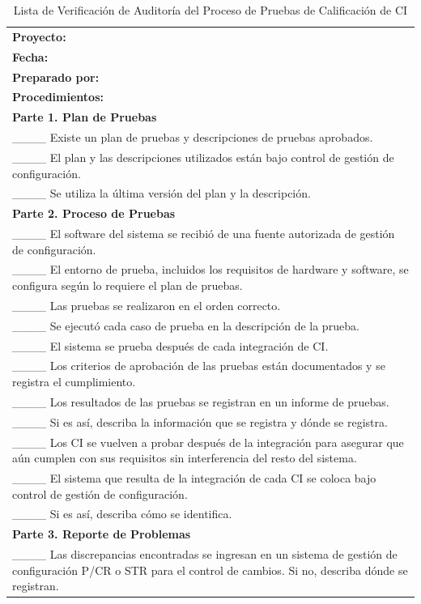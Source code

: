 \begin{table}[H]
\centering
\caption{Lista de Verificación de Auditoría del Proceso de Pruebas de Calificación de CI}
\label{fig:b9}
\begin{tabular}{|p{14cm}|}
\hline
\textbf{Proyecto:} \\
\textbf{Fecha:} \\
\textbf{Preparado por:} \\
\hline
\textbf{Procedimientos:} \\
\textbf{Parte 1. Plan de Pruebas} \\
\_\_\_\_ Existe un plan de pruebas y descripciones de pruebas aprobados. \\
\_\_\_\_ El plan y las descripciones utilizados están bajo control de gestión de configuración. \\
\_\_\_\_ Se utiliza la última versión del plan y la descripción. \\
\textbf{Parte 2. Proceso de Pruebas} \\
\_\_\_\_ El software del sistema se recibió de una fuente autorizada de gestión de configuración. \\
\_\_\_\_ El entorno de prueba, incluidos los requisitos de hardware y software, se configura según lo requiere el plan de pruebas. \\
\_\_\_\_ Las pruebas se realizaron en el orden correcto. \\
\_\_\_\_ Se ejecutó cada caso de prueba en la descripción de la prueba. \\
\_\_\_\_ El sistema se prueba después de cada integración de CI. \\
\_\_\_\_ Los criterios de aprobación de las pruebas están documentados y se registra el cumplimiento. \\
\_\_\_\_ Los resultados de las pruebas se registran en un informe de pruebas. \\
\_\_\_\_ Si es así, describa la información que se registra y dónde se registra. \\
\_\_\_\_ Los CI se vuelven a probar después de la integración para asegurar que aún cumplen con sus requisitos sin interferencia del resto del sistema. \\
\_\_\_\_ El sistema que resulta de la integración de cada CI se coloca bajo control de gestión de configuración. \\
\_\_\_\_ Si es así, describa cómo se identifica. \\
\textbf{Parte 3. Reporte de Problemas} \\
\_\_\_\_ Las discrepancias encontradas se ingresan en un sistema de gestión de configuración P/CR o STR para el control de cambios. Si no, describa dónde se registran. \\

\end{tabular}
\end{table}
